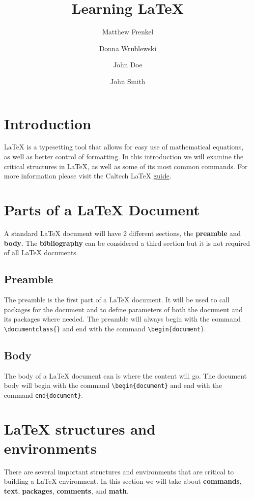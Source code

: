 \documentclass{article} 	%
\title{Learning \LaTeX}
\author[1]{Matthew Frenkel}
\author[2]{Donna Wrublewski}
\author[1]{John Doe}
\author[1,*]{John Smith}
\affil[1]{NYU}
\affil[2]{Caltech}
\affil[*]{ASCE}
\numberwithin{equation}{section}
\begin{document}
	\maketitle
	\newpage
	\tableofcontents
	\newpage

	\section{Introduction}
	\LaTeX{} is a typesetting tool that allows for easy use of mathematical equations, as well as better control of formatting.  In this introduction we will examine the critical structures in \LaTeX{}, as well as some of its most common commands.  For more information please visit the Caltech \LaTeX{} \href{http://libguides.caltech.edu/latex}{guide}.

	

	\section{Parts of a LaTeX Document}
	A standard \LaTeX{} document will have 2 different sections, the \textbf{preamble} and \textbf{body}.  The \textbf{bibliography} can be considered a third section but it is not required of all \LaTeX{} documents.

		\subsection{Preamble}
	The preamble is the first part of a \LaTeX{} document.  It will be used to call packages for the document and to define parameters of both the document and its packages where needed.  The preamble will always begin with the command \verb|\documentclass{}| and end with the command \verb|\begin{document}|.

		\subsection{Body}
	The body of a \LaTeX{} document can is where the content will go.  The document body will begin with the command \verb|\begin{document}| and end with the command \verb|end{document}|.

	\section{\LaTeX{} structures and environments}
	There are several important structures and environments that are critical to building a \LaTeX{} environment.  In this section we will take about \textbf{commands}, \textbf{text}, \textbf{packages}, \textbf{comments}, and \textbf{math}.
\end{document}
